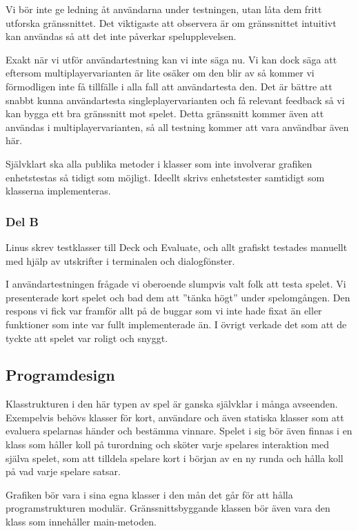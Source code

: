 \documentclass[10pt,twoside,a4paper]{article}
\begin{document}
Vi bör inte ge ledning åt användarna under testningen, utan låta dem fritt
utforska gränssnittet. Det viktigaste att observera är om gränssnittet
intuitivt kan användas så att det inte påverkar spelupplevelsen.

Exakt när vi utför användartestning kan vi inte säga nu. Vi kan dock säga
att eftersom multiplayervarianten är lite osäker om den blir av så kommer
vi förmodligen inte få tillfälle i alla fall att användartesta den. Det är
bättre att snabbt kunna användartesta singleplayervarianten och få relevant
feedback så vi kan bygga ett bra gränssnitt mot spelet. Detta gränssnitt
kommer även att användas i multiplayervarianten, så all testning kommer att
vara användbar även här.

Självklart ska alla publika metoder i klasser som inte involverar grafiken
enhetstestas så tidigt som möjligt. Ideellt skrivs enhetstester samtidigt
som klasserna implementeras.

\subsubsection*{Del B}

Linus skrev testklasser till Deck och Evaluate, och allt grafiskt testades
manuellt med hjälp av utskrifter i terminalen och dialogfönster.

I användartestningen frågade vi oberoende slumpvis valt folk att testa
spelet. Vi presenterade kort spelet och bad dem att ''tänka högt'' under
spelomgången. Den respons vi fick var framför allt på de buggar som vi inte
hade fixat än eller funktioner som inte var fullt implementerade än. I
övrigt verkade det som att de tyckte att spelet var roligt och snyggt.

\subsection*{Programdesign}

Klasstrukturen i den här typen av spel är ganska självklar i många
avseenden. Exempelvis behövs klasser för kort, användare och även statiska
klasser som att evaluera spelarnas händer och bestämma vinnare. Spelet i
sig bör även finnas i en klass som håller koll på turordning och sköter
varje spelares interaktion med själva spelet, som att tilldela spelare kort
i början av en ny runda och hålla koll på vad varje spelare satsar.

Grafiken bör vara i sina egna klasser i den mån det går för att hålla
programstrukturen modulär. Gränssnittsbyggande klassen bör även vara den
klass som innehåller main-metoden.
\end{document}
